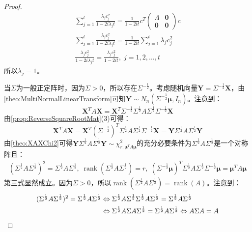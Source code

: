 \begin{proof}
\begin{gather*}
		\sum_{j=1}^{t}\frac{\lambda_jc_j^2}{1-2i\lambda_jt}=\frac{1}{1-2it}c^T
		\begin{pmatrix}
			\varLambda & \mathbf{0} \\
			\mathbf{0} & \mathbf{0}
		\end{pmatrix}
		c \\
		\sum_{j=1}^{t}\frac{\lambda_jc_j^2}{1-2i\lambda_jt}=\frac{1}{1-2it}\sum_{j=1}^{t}\lambda_jc_j^2 \\
		\frac{\lambda_jc_j^2}{1-2i\lambda_jt}=\frac{\lambda_jc_j^2}{1-2it},\;j=1,2,\dots,t
	\end{gather*}
	所以$\lambda_j=1$。\par
	当$\Sigma$为一般正定阵时，因为$\Sigma>0$，所以存在$\Sigma^{-\frac{1}{2}}$。考虑随机向量$\mathbf{Y}=\Sigma^{-\frac{1}{2}}\mathbf{X}$，由\cref{theo:MultiNormalLinearTransform}可知$\mathbf{Y}\sim N_n(\Sigma^{-\frac{1}{2}}\boldsymbol{\mu},I_n)$。注意到：
	\begin{equation*}
		\mathbf{X}^TA\mathbf{X}=\mathbf{X}^T\Sigma^{-\frac{1}{2}}\Sigma
		^{\frac{1}{2}}A\Sigma^{\frac{1}{2}}\Sigma^{-\frac{1}{2}}\mathbf{X}
	\end{equation*}
	由\cref{prop:ReverseSquareRootMat}(3)可得：
	\begin{equation*}
		\mathbf{X}^TA\mathbf{X}=\mathbf{X}^T(\Sigma^{-\frac{1}{2}})^T\Sigma
		^{\frac{1}{2}}A\Sigma^{\frac{1}{2}}\Sigma^{-\frac{1}{2}}\mathbf{X}=\mathbf{Y}\Sigma
		^{\frac{1}{2}}A\Sigma^{\frac{1}{2}}\mathbf{Y}
	\end{equation*}
	由\cref{theo:XAXChi2}可得$\mathbf{Y}\Sigma
	^{\frac{1}{2}}A\Sigma^{\frac{1}{2}}\mathbf{Y}\sim\chi_{r,\boldsymbol{\mu}^TA\boldsymbol{\mu}}^2$的充分必要条件为$\Sigma
	^{\frac{1}{2}}A\Sigma^{\frac{1}{2}}$是一个对称阵且：
	\begin{gather*}
		(\Sigma
		^{\frac{1}{2}}A\Sigma^{\frac{1}{2}})^2=\Sigma
		^{\frac{1}{2}}A\Sigma^{\frac{1}{2}},\;
		\operatorname{rank}(\Sigma
		^{\frac{1}{2}}A\Sigma^{\frac{1}{2}})=r,\;
		(\Sigma^{-\frac{1}{2}}\boldsymbol{\mu})^T\Sigma^{\frac{1}{2}} A\Sigma^{\frac{1}{2}}\Sigma^{-\frac{1}{2}}\boldsymbol{\mu}=\boldsymbol{\mu}^TA\boldsymbol{\mu}
	\end{gather*}
	第三式显然成立。因为$\Sigma>0$，所以$\operatorname{rank}(\Sigma
	^{\frac{1}{2}}A\Sigma^{\frac{1}{2}})=\operatorname{rank}(A)$。注意到：
	\begin{align*}
		(\Sigma
		^{\frac{1}{2}}A\Sigma^{\frac{1}{2}})^2=\Sigma
		^{\frac{1}{2}}A\Sigma^{\frac{1}{2}}&\Leftrightarrow
		\Sigma
		^{\frac{1}{2}}A\Sigma^{\frac{1}{2}}\Sigma
		^{\frac{1}{2}}A\Sigma^{\frac{1}{2}}=\Sigma
		^{\frac{1}{2}}A\Sigma^{\frac{1}{2}} \\
		&\Leftrightarrow
		\Sigma^{\frac{1}{2}}A\Sigma A\Sigma^{\frac{1}{2}}=\Sigma
		^{\frac{1}{2}}A\Sigma^{\frac{1}{2}}\Leftrightarrow
		A\Sigma A=A\qedhere
	\end{align*}
\end{proof}
